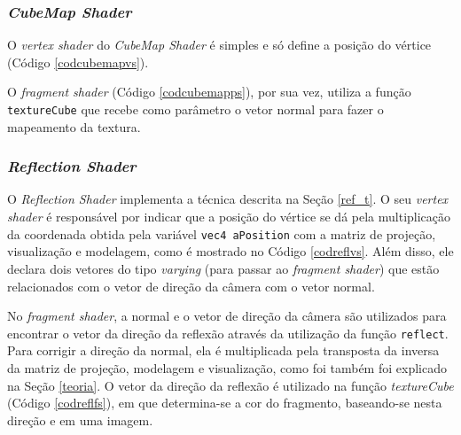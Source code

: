 	

\subsubsection{\textit{CubeMap Shader}}	

	 O \textit{vertex shader} do \textit{CubeMap Shader} é simples e só define a posição do vértice (Código \ref{codcubemapvs}). 

	

	O  \textit{fragment shader} (Código \ref{codcubemapps}), por sua vez, utiliza a função \texttt{textureCube} que recebe como parâmetro o vetor normal para fazer o mapeamento da textura. 

	
	
\subsubsection{\textit{Reflection Shader}}

	O \textit{Reflection Shader} implementa a técnica descrita na Seção \ref{ref_t}. O seu \textit{vertex shader} é responsável por indicar que a posição do vértice se dá pela multiplicação da coordenada obtida pela variável \texttt{vec4 aPosition} com a matriz de projeção, visualização e modelagem, como é mostrado no Código \ref{codreflvs}. Além disso, ele declara dois vetores do tipo \textit{varying} (para passar ao \textit{fragment shader}) que estão relacionados com o vetor de direção da câmera com o vetor normal. 

	

	No \textit{fragment shader}, a normal e o vetor de direção da câmera são utilizados para encontrar o vetor da direção da reflexão através da utilização da função \texttt{reflect}. Para corrigir a direção da normal, ela é multiplicada pela transposta da inversa da matriz de projeção, modelagem e visualização, como foi também foi explicado na Seção \ref{teoria}. O vetor da direção da reflexão é utilizado na função \textit{textureCube} (Código \ref{codreflfs}), em que determina-se a cor do fragmento, baseando-se nesta direção e em uma imagem. 

